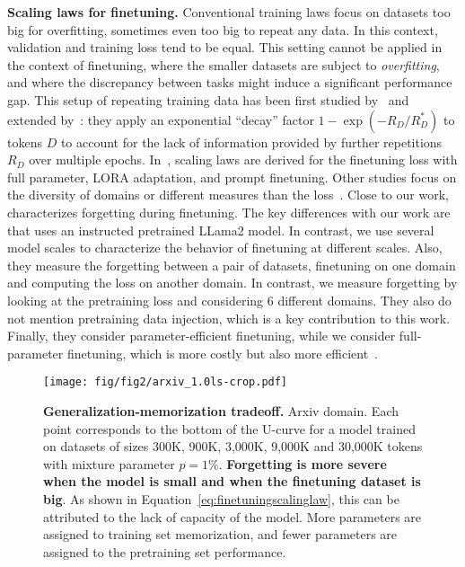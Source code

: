 \textbf{Scaling laws for finetuning.} Conventional training laws focus on datasets too big for overfitting, sometimes even too big to repeat any data. In this context, validation and training loss tend to be equal. This setting cannot be applied in the context of finetuning, where the smaller datasets are subject to \textit{overfitting}, and where the discrepancy between tasks might induce a significant performance gap. This setup of repeating training data has been first studied by~\citet{hernandez2021scalinglaws} and extended by~\citet{muennighoff2023scaling}: they apply an exponential ``decay'' factor $1-\exp{(-{R_D}/{R_D^*})}$ to tokens $D$ to account for the lack of information provided by further repetitions $R_D$ over multiple epochs. In~\citet{zhang2024when}, scaling laws are derived for the finetuning loss with full parameter, LORA adaptation, and prompt finetuning.
Other studies focus on the diversity of domains or different measures than the loss~\citep{barnett2024empirical,isik2024scaling}. 
Close to our work,~\citet{kalajdzievski2024scaling} characterizes forgetting during finetuning. 
The key differences with our work are that \citet{kalajdzievski2024scaling} uses an instructed pretrained LLama2 model. In contrast, we use several model scales to characterize the behavior of finetuning at different scales. 
Also, they measure the forgetting between a pair of datasets, finetuning on one domain and computing the loss on another domain.
In contrast, we measure forgetting by looking at the pretraining loss and considering 6 different domains.
They also do not mention pretraining data injection, which is a key contribution to this work. 
Finally, they consider parameter-efficient finetuning, while we consider full-parameter finetuning, which is more costly but also more efficient~\citep{zhang2024when}.

\begin{figure}[t]
    \centering
    \texttt{[image: fig/fig2/arxiv\_1.0ls-crop.pdf]}
    \caption{\textbf{Generalization-memorization tradeoff.} Arxiv domain. Each point corresponds to the bottom of the U-curve for a model trained on datasets of sizes 300K, 900K, 3,000K, 9,000K and 30,000K tokens with mixture parameter $p=1\%$. \textbf{Forgetting is more severe when the model is small and when the finetuning dataset is big}. As shown in Equation~\ref{eq:finetuningscalinglaw}, this can be attributed to the lack of capacity of the model. More parameters are assigned to training set memorization, and fewer parameters are assigned to the pretraining set performance.}
    \label{fig:paretoplot}
\end{figure}

